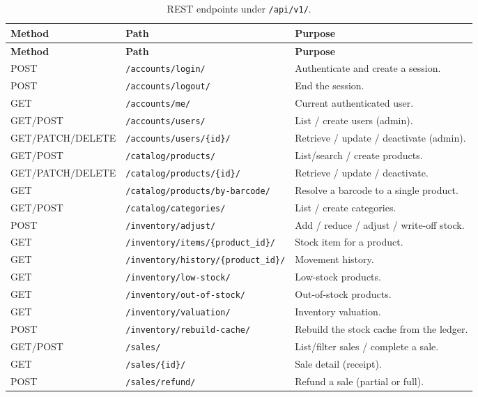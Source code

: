 \documentclass[11pt,a4paper]{article}
\begin{document}
\begin{longtable}{@{}p{}p{}p{}@{}}
\caption{REST endpoints under \texttt{/api/v1/}.}\\
\toprule
\textbf{Method} & \textbf{Path} & \textbf{Purpose} \\
\midrule
\endfirsthead
\toprule
\textbf{Method} & \textbf{Path} & \textbf{Purpose} \\
\midrule
\endhead
\bottomrule
\endfoot
POST & \texttt{/accounts/login/} & Authenticate and create a session. \\
POST & \texttt{/accounts/logout/} & End the session. \\
GET & \texttt{/accounts/me/} & Current authenticated user. \\
GET/POST & \texttt{/accounts/users/} & List / create users (admin). \\
GET/PATCH/DELETE & \texttt{/accounts/users/\{id\}/} & Retrieve / update / deactivate (admin). \\
GET/POST & \texttt{/catalog/products/} & List/search / create products. \\
GET/PATCH/DELETE & \texttt{/catalog/products/\{id\}/} & Retrieve / update / deactivate. \\
GET & \texttt{/catalog/products/by-barcode/} & Resolve a barcode to a single product. \\
GET/POST & \texttt{/catalog/categories/} & List / create categories. \\
POST & \texttt{/inventory/adjust/} & Add / reduce / adjust / write-off stock. \\
GET & \texttt{/inventory/items/\{product\_id\}/} & Stock item for a product. \\
GET & \texttt{/inventory/history/\{product\_id\}/} & Movement history. \\
GET & \texttt{/inventory/low-stock/} & Low-stock products. \\
GET & \texttt{/inventory/out-of-stock/} & Out-of-stock products. \\
GET & \texttt{/inventory/valuation/} & Inventory valuation. \\
POST & \texttt{/inventory/rebuild-cache/} & Rebuild the stock cache from the ledger. \\
GET/POST & \texttt{/sales/} & List/filter sales / complete a sale. \\
GET & \texttt{/sales/\{id\}/} & Sale detail (receipt). \\
POST & \texttt{/sales/refund/} & Refund a sale (partial or full). \\

\end{longtable}
\end{document}
